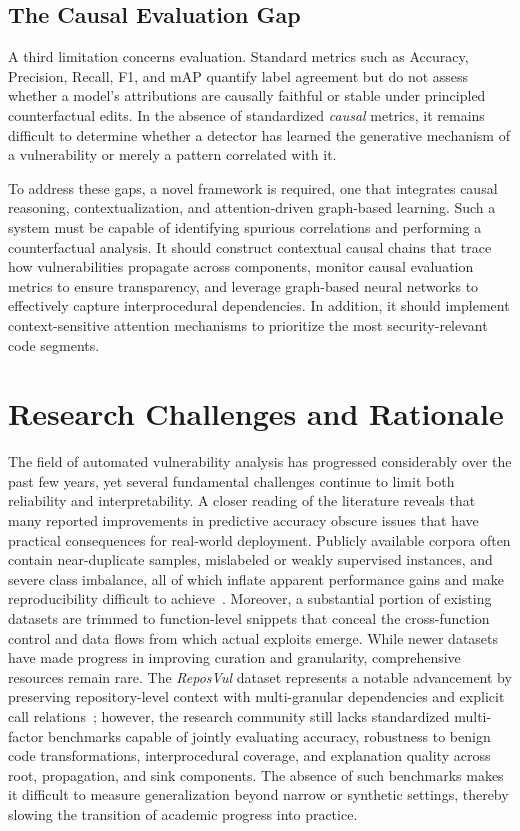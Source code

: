 \documentclass{buthesis}
\begin{document}
\subsection{The Causal Evaluation Gap}
A third limitation concerns evaluation. Standard metrics such as Accuracy, Precision, Recall, F1, and mAP quantify label agreement but do not assess whether a model’s attributions are causally faithful or stable under principled counterfactual edits. In the absence of standardized \emph{causal} metrics, it remains difficult to determine whether a detector has learned the generative mechanism of a vulnerability or merely a pattern correlated with it.

\bigskip\noindent
To address these gaps, a novel framework is required, one that integrates causal
reasoning, contextualization, and attention-driven graph-based learning. Such a system must be capable of identifying spurious correlations and performing a counterfactual analysis. It should construct contextual causal chains that trace how vulnerabilities propagate across components, monitor causal evaluation metrics to ensure transparency, and leverage graph-based neural networks to effectively capture interprocedural dependencies. In addition, it should implement context-sensitive attention mechanisms to prioritize the most security-relevant code segments.


\section{Research Challenges and Rationale}
\label{sec:litreview-challenges}

The field of automated vulnerability analysis has progressed considerably over the past few years, yet several fundamental challenges continue to limit both reliability and interpretability. A closer reading of the literature reveals that many reported improvements in predictive accuracy obscure issues that have practical consequences for real-world deployment. Publicly available corpora often contain near-duplicate samples, mislabeled or weakly supervised instances, and severe class imbalance, all of which inflate apparent performance gains and make reproducibility difficult to achieve~\cite{Li2022Empirical,Chakraborty2020}. Moreover, a substantial portion of existing datasets are trimmed to function-level snippets that conceal the cross-function control and data flows from which actual exploits emerge. While newer datasets have made progress in improving curation and granularity, comprehensive resources remain rare. The \emph{ReposVul} dataset represents a notable advancement by preserving repository-level context with multi-granular dependencies and explicit call relations~\cite{wang2024reposvul}; however, the research community still lacks standardized multi-factor benchmarks capable of jointly evaluating accuracy, robustness to benign code transformations, interprocedural coverage, and explanation quality across root, propagation, and sink components. The absence of such benchmarks makes it difficult to measure generalization beyond narrow or synthetic settings, thereby slowing the transition of academic progress into practice.
\end{document}
